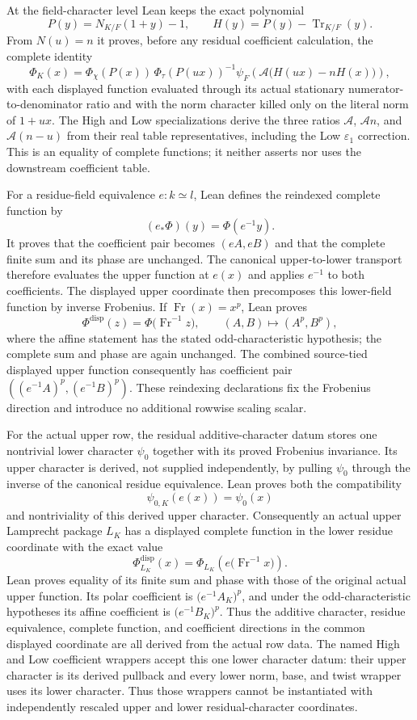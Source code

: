 \begin{definition}
At the field-character level Lean keeps the exact polynomial
\[
 P(y)=N_{K/F}(1+y)-1,
 \qquad H(y)=P(y)-\operatorname{Tr}_{K/F}(y).
\]
From $N(u)=n$ it proves, before any residual coefficient calculation, the
complete identity
\[
 \Phi_K(x)=\Phi_\chi(P(x))\,\Phi_\tau(P(ux))^{-1}
   \psi_F\!\left(\mathcal A\bigl(H(ux)-nH(x)\bigr)\right),
\]
with each displayed function evaluated through its actual stationary
numerator-to-denominator ratio and with the norm character killed only on
the literal norm of $1+ux$.  The High and Low specializations derive the
three ratios $\mathcal A$, $\mathcal A n$, and
$\mathcal A(n-u)$ from their real table representatives, including the Low
$\varepsilon_1$ correction.  This is an equality of complete functions;
it neither asserts nor uses the downstream coefficient table.

For a residue-field equivalence $e:k\simeq l$, Lean defines the reindexed
complete function by
\[
 (e_*\Phi)(y)=\Phi(e^{-1}y).
\]
It proves that the coefficient pair becomes $(eA,eB)$ and that the complete
finite sum and its phase are unchanged.  The canonical upper-to-lower
transport therefore evaluates the upper function at $e(x)$ and applies
$e^{-1}$ to both coefficients.  The displayed upper coordinate then
precomposes this lower-field function by inverse Frobenius.  If
$\operatorname{Fr}(x)=x^p$, Lean proves
\[
 \Phi^{\mathrm{disp}}(z)=
   \Phi\bigl(\operatorname{Fr}^{-1}z\bigr),
 \qquad (A,B)\longmapsto(A^p,B^p),
\]
where the affine statement has the stated odd-characteristic hypothesis;
the complete sum and phase are again unchanged.  The combined source-tied
displayed upper function consequently has coefficient pair
$((e^{-1}A)^p,(e^{-1}B)^p)$.  These reindexing declarations fix the
Frobenius direction and introduce no additional rowwise scaling scalar.

For the actual upper row, the residual additive-character datum stores one
nontrivial lower character $\psi_0$ together with its proved Frobenius
invariance.  Its upper character is derived, not supplied independently, by
pulling $\psi_0$ through the inverse of the canonical residue equivalence.
Lean proves both the compatibility
\[
 \psi_{0,K}(e(x))=\psi_0(x)
\]
and nontriviality of this derived upper character.  Consequently an actual
upper Lamprecht package $L_K$ has a displayed complete function in the lower
residue coordinate with the exact value
\[
 \Phi^{\mathrm{disp}}_{L_K}(x)=
 \Phi_{L_K}\!\left(e\bigl(\operatorname{Fr}^{-1}x\bigr)\right).
\]
Lean proves equality of its finite sum and phase with those of the original
actual upper function.  Its polar coefficient is
$\bigl(e^{-1}A_K\bigr)^p$, and under the odd-characteristic hypotheses its
affine coefficient is $\bigl(e^{-1}B_K\bigr)^p$.  Thus the additive
character, residue equivalence, complete function, and coefficient
directions in the common displayed coordinate are all derived from the
actual row data.  The named High and Low coefficient wrappers accept this
one lower character datum: their upper character is its derived pullback and
every lower norm, base, and twist wrapper uses its lower character.  Thus
those wrappers cannot be instantiated with independently rescaled upper and
lower residual-character coordinates.


\end{definition}
